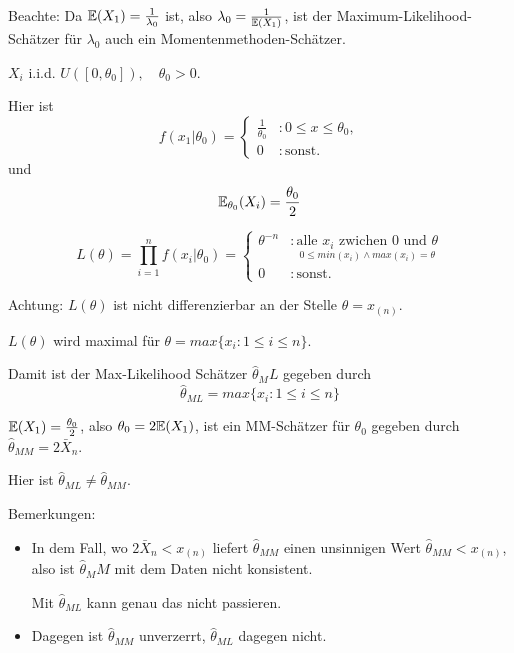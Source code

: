 \documentclass{tstextbook}
\begin{document}
\begin{remark}
	Beachte: Da $ \mathbb E(X_1)=\frac{1}{\lambda_0} $ ist, also $ \lambda_0 = \frac{1}{\mathbb E(X_1)} $, ist der Maximum-Likelihood-Schätzer für $ \lambda_0 $ auch ein Momentenmethoden-Schätzer.
\end{remark}

\begin{example}
	$ X_i $ i.i.d. $ U([0,\theta_0]), \quad \theta_0 > 0 $. 
	
	Hier ist 
	\[
	f(x_1|\theta_0)=\left\{\begin{array}{ll}
		\frac{1}{\theta_0} & \colon 0\le x\le \theta_0, \\
		0 & \colon \text{sonst} .
	\end{array}\right .
	\]
	und
	\[
	\mathbb E_{\theta_0} (X_i) = \frac{\theta_0}{2}
	\]
	
	
	\[
	L(\theta) = \prod_{i=1}^{n} f(x_i|\theta_0)=\left\{\begin{array}{ll}
	\theta^{-n} & \colon \underset{0 \leq min(x_i) \wedge max(x_i)= \theta }{\text{alle } x_i \text{ zwichen } 0 \text{ und } \theta } \\
		0 & \colon  \text{sonst} .
	\end{array}\right .
	\]
	
	Achtung: $ L(\theta) $ ist nicht differenzierbar an der Stelle $ \theta = x_{(n)} $. 
	
	$ L(\theta) $ wird maximal für $\theta=max \{ x_i: 1 \leq i \leq n \} $.
	
	Damit ist der Max-Likelihood Schätzer $\hat{\theta}_ML$ gegeben durch \[  \hat{\theta}_{ML} = max \{ x_i: 1 \leq i \leq n \} \]
	
	$ \mathbb E(X_1) = \frac{\theta_0}{2} $, also $ \theta_0 = 2 \mathbb E (X_1) $, ist ein MM-Schätzer für $ \theta_0 $ gegeben durch $ \hat{\theta}_{MM} = 2 \bar{X}_n $.
	
	Hier ist $ \hat{\theta}_{ML} \ne \hat{\theta}_{MM} $.
	
	Bemerkungen:
	\begin{itemize}
		\item In dem Fall, wo $ 2\bar{X}_n < x_{(n)} $ liefert $ \hat{\theta}_{MM} $ einen unsinnigen Wert $ \hat{\theta}_{MM} < x_{(n)} $, also ist $\hat{\theta}_MM$ mit dem Daten nicht konsistent.
		
		Mit $ \hat{\theta}_{ML} $ kann genau das nicht passieren.
		\item Dagegen ist $ \hat{\theta}_{MM} $ unverzerrt, $ \hat{\theta}_{ML} $ dagegen nicht.
	\end{itemize}
	
\end{example}
\end{document}
